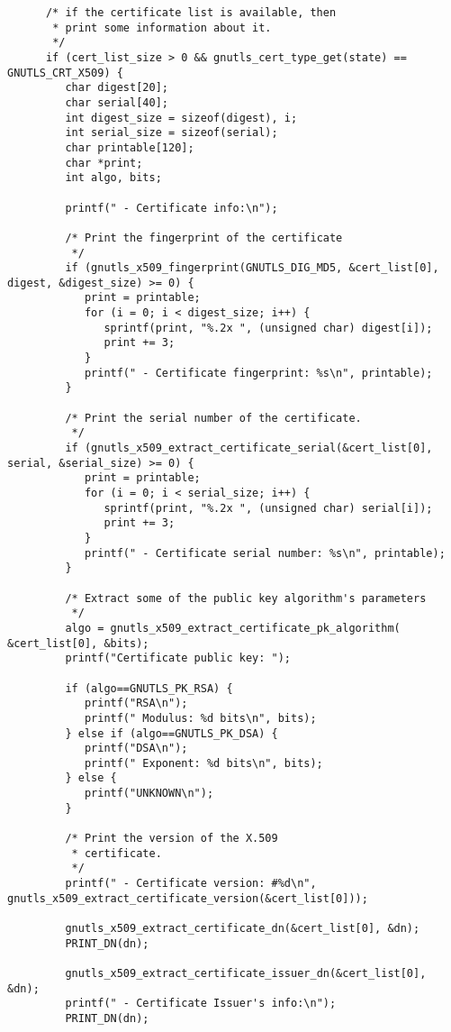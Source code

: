 \begin{verbatim}
      /* if the certificate list is available, then
       * print some information about it.
       */
      if (cert_list_size > 0 && gnutls_cert_type_get(state) == GNUTLS_CRT_X509) {
         char digest[20];
         char serial[40];
         int digest_size = sizeof(digest), i;
         int serial_size = sizeof(serial);
         char printable[120];
         char *print;
         int algo, bits;

         printf(" - Certificate info:\n");

         /* Print the fingerprint of the certificate
          */
         if (gnutls_x509_fingerprint(GNUTLS_DIG_MD5, &cert_list[0], digest, &digest_size) >= 0) {
            print = printable;
            for (i = 0; i < digest_size; i++) {
               sprintf(print, "%.2x ", (unsigned char) digest[i]);
               print += 3;
            }
            printf(" - Certificate fingerprint: %s\n", printable);
         }

         /* Print the serial number of the certificate.
          */
         if (gnutls_x509_extract_certificate_serial(&cert_list[0], serial, &serial_size) >= 0) {
            print = printable;
            for (i = 0; i < serial_size; i++) {
               sprintf(print, "%.2x ", (unsigned char) serial[i]);
               print += 3;
            }
            printf(" - Certificate serial number: %s\n", printable);
         }

         /* Extract some of the public key algorithm's parameters
          */
         algo = gnutls_x509_extract_certificate_pk_algorithm( &cert_list[0], &bits);
         printf("Certificate public key: ");

         if (algo==GNUTLS_PK_RSA) {
            printf("RSA\n");
            printf(" Modulus: %d bits\n", bits);
         } else if (algo==GNUTLS_PK_DSA) {
            printf("DSA\n");
            printf(" Exponent: %d bits\n", bits);
         } else {
            printf("UNKNOWN\n");
         }

         /* Print the version of the X.509 
          * certificate.
          */
         printf(" - Certificate version: #%d\n", gnutls_x509_extract_certificate_version(&cert_list[0]));

         gnutls_x509_extract_certificate_dn(&cert_list[0], &dn);
         PRINT_DN(dn);

         gnutls_x509_extract_certificate_issuer_dn(&cert_list[0], &dn);
         printf(" - Certificate Issuer's info:\n");
         PRINT_DN(dn);


\end{verbatim}
